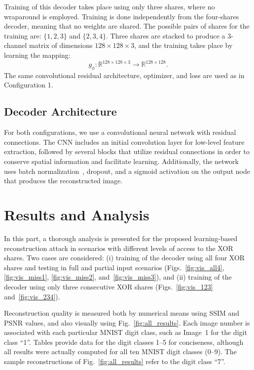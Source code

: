 Training of this decoder takes place using only three shares, where no wraparound is employed. Training is done independently from the four-shares decoder, meaning that no weights are shared.
The possible pairs of shares for the training are: $\{1,2,3\}$ and $\{2,3,4\}$. Three shares are stacked to produce a 3-channel matrix of dimensions $128 \times 128 \times 3$, and the training takes place by learning the mapping:
\begin{equation}
g_\phi : \mathbb{R}^{128 \times 128 \times 3} \rightarrow \mathbb{R}^{128 \times 128}.
\end{equation}
The same convolutional residual architecture, optimizer, and loss are used as
in Configuration 1.


\subsection{Decoder Architecture}

For both configurations, we use a convolutional neural network with
residual connections. The CNN includes an initial
convolution layer for low-level feature extraction, followed by several
blocks that utilize residual connections in order to conserve spatial
information and facilitate learning. Additionally, the network uses
batch normalization~\cite{ioffe2015batch}, dropout,
and a sigmoid activation on the output node that produces the reconstructed
image.





\section{Results and Analysis}
\label{sec:lad-results}

In this part, a thorough analysis is presented for the proposed learning-based reconstruction attack in scenarios with different levels of access to the XOR shares. Two cases are considered: (i) training of the decoder using all four XOR shares and testing in full and partial input scenarios (Figs.~\ref{fig:vis_all4}, \ref{fig:vis_miss1}, \ref{fig:vis_miss2}, and~\ref{fig:vis_miss3}), and (ii) training of the decoder using only three consecutive XOR shares (Figs.~\ref{fig:vis_123} and~\ref{fig:vis_234}).

Reconstruction quality is measured both by numerical means using SSIM and PSNR
values, and also visually using Fig.~\ref{fig:all_results}.
Each image number is associated with each particular MNIST digit class, such
as Image~1 for the digit class ``1''. Tables provide data for the digit
classes 1--5 for conciseness, although all results were actually computed for
all ten MNIST digit classes (0--9). The sample reconstructions of
Fig.~\ref{fig:all_results} refer to the digit class ``7''.

